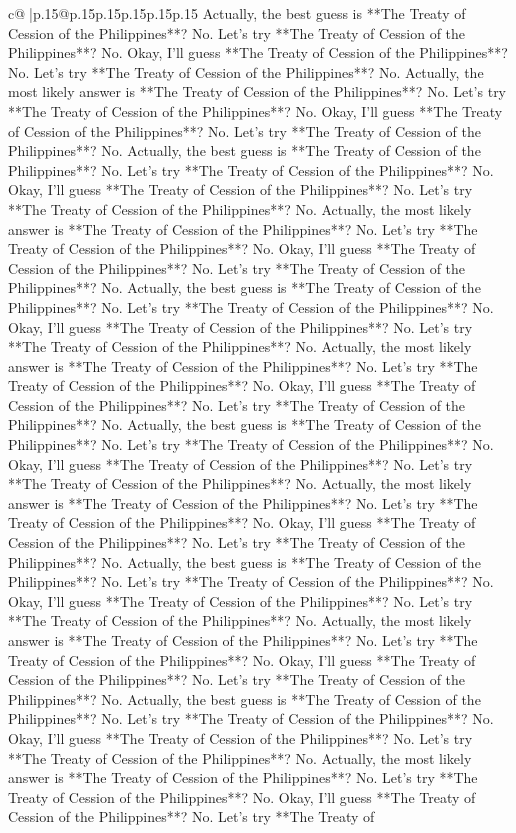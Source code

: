 \documentclass{article}
\begin{document}
{\begin{supertabular}{c@{$\;$}|p{.15\linewidth}@{}p{.15\linewidth}p{.15\linewidth}p{.15\linewidth}p{.15\linewidth}p{.15\linewidth}}
{{{Actually, the best guess is **The Treaty of Cession of the Philippines**? No. Let's try **The Treaty of Cession of the Philippines**? No. Okay, I'll guess **The Treaty of Cession of the Philippines**? No. Let's try **The Treaty of Cession of the Philippines**? No. Actually, the most likely answer is **The Treaty of Cession of the Philippines**? No. Let's try **The Treaty of Cession of the Philippines**? No. Okay, I'll guess **The Treaty of Cession of the Philippines**? No. Let's try **The Treaty of Cession of the Philippines**? No. Actually, the best guess is **The Treaty of Cession of the Philippines**? No. Let's try **The Treaty of Cession of the Philippines**? No. Okay, I'll guess **The Treaty of Cession of the Philippines**? No. Let's try **The Treaty of Cession of the Philippines**? No. Actually, the most likely answer is **The Treaty of Cession of the Philippines**? No. Let's try **The Treaty of Cession of the Philippines**? No. Okay, I'll guess **The Treaty of Cession of the Philippines**? No. Let's try **The Treaty of Cession of the Philippines**? No. Actually, the best guess is **The Treaty of Cession of the Philippines**? No. Let's try **The Treaty of Cession of the Philippines**? No. Okay, I'll guess **The Treaty of Cession of the Philippines**? No. Let's try **The Treaty of Cession of the Philippines**? No. Actually, the most likely answer is **The Treaty of Cession of the Philippines**? No. Let's try **The Treaty of Cession of the Philippines**? No. Okay, I'll guess **The Treaty of Cession of the Philippines**? No. Let's try **The Treaty of Cession of the Philippines**? No. Actually, the best guess is **The Treaty of Cession of the Philippines**? No. Let's try **The Treaty of Cession of the Philippines**? No. Okay, I'll guess **The Treaty of Cession of the Philippines**? No. Let's try **The Treaty of Cession of the Philippines**? No. Actually, the most likely answer is **The Treaty of Cession of the Philippines**? No. Let's try **The Treaty of Cession of the Philippines**? No. Okay, I'll guess **The Treaty of Cession of the Philippines**? No. Let's try **The Treaty of Cession of the Philippines**? No. Actually, the best guess is **The Treaty of Cession of the Philippines**? No. Let's try **The Treaty of Cession of the Philippines**? No. Okay, I'll guess **The Treaty of Cession of the Philippines**? No. Let's try **The Treaty of Cession of the Philippines**? No. Actually, the most likely answer is **The Treaty of Cession of the Philippines**? No. Let's try **The Treaty of Cession of the Philippines**? No. Okay, I'll guess **The Treaty of Cession of the Philippines**? No. Let's try **The Treaty of Cession of the Philippines**? No. Actually, the best guess is **The Treaty of Cession of the Philippines**? No. Let's try **The Treaty of Cession of the Philippines**? No. Okay, I'll guess **The Treaty of Cession of the Philippines**? No. Let's try **The Treaty of Cession of the Philippines**? No. Actually, the most likely answer is **The Treaty of Cession of the Philippines**? No. Let's try **The Treaty of Cession of the Philippines**? No. Okay, I'll guess **The Treaty of Cession of the Philippines**? No. Let's try **The Treaty of }}}
\end{supertabular}}
\end{document}
